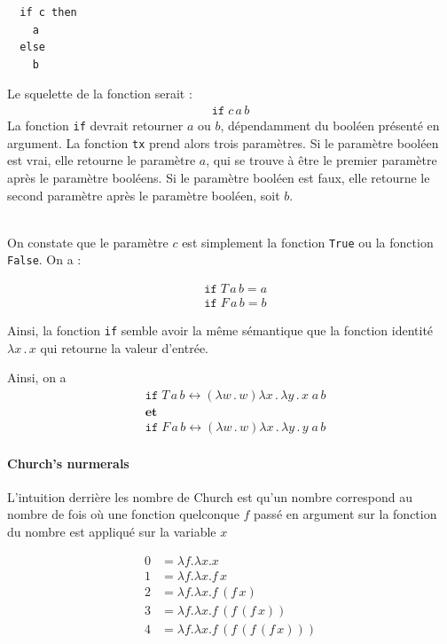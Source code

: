 \documentclass{report}
\begin{document}
\begin{multicols*}{3}
  \begin{lstlisting}
  if c then 
    a 
  else 
    b
  \end{lstlisting}

  Le squelette de la fonction serait : 
  \begin{align*}
    \texttt{if} \; c \, a \, b  
  \end{align*}
  La fonction \texttt{if} devrait retourner $a$ ou $b$, dépendamment 
  du booléen présenté en argument. La fonction \texttt{tx} prend alors 
  trois paramètres. Si le paramètre booléen est vrai, elle retourne 
  le paramètre $a$, qui se trouve à être le premier paramètre après le paramètre 
  booléens. Si le paramètre booléen est faux, elle retourne le second paramètre
  après le paramètre booléen, soit $b$. 

  \mbox{}\\ 
  On constate que le paramètre $c$ est simplement la fonction 
  \texttt{True} ou la fonction \texttt{False}. On a : 

  \begin{align*}
    &\texttt{if} \; T \, a \, b = a   \\
    &\texttt{if} \; F \, a \, b = b   
  \end{align*}

  Ainsi, la fonction \texttt{if} semble avoir la même sémantique que la 
  fonction identité $\lambda x \, . \, x$ qui retourne la valeur 
  d'entrée. 

  Ainsi, on a 
  \begin{align*}
     &\texttt{if} \; T \, a \, b \leftrightarrow 
     (\lambda w \, . \, w) \lambda x \, . \, \lambda y \, . \, x \; a \, b        
     \\
     &\textbf{et}
     \\
     &\texttt{if} \; F \, a \, b \leftrightarrow 
     (\lambda w \, . \, w) \lambda x \, . \, \lambda y \, . \, y \; a \, b        
  \end{align*}

  \paragraph{Church's nurmerals}  
  L'intuition derrière les nombre de Church est qu'un nombre 
  correspond au nombre de fois où une fonction quelconque $f$ 
  passé en argument sur la fonction du nombre est appliqué sur la 
  variable $x$

  \[
  \begin{aligned}
  0 &= \lambda f . \lambda x . x \\
  1 &= \lambda f . \lambda x . f \, x \\
  2 &= \lambda f . \lambda x . f \, (f \, x) \\
  3 &= \lambda f . \lambda x . f \, (f \, (f \, x)) \\
  4 &= \lambda f . \lambda x . f \, (f \, (f \, (f \, x))) \\
  \end{aligned}
  \]



\end{multicols*}
\end{document}

